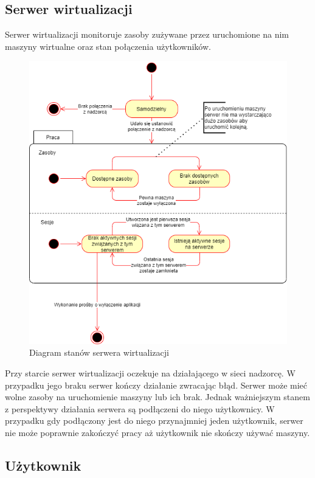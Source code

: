 \documentclass[../opis-rozwiazania.tex]{subfiles}
\begin{document}
\subsection{Serwer wirtualizacji}

Serwer wirtualizacji monitoruje zasoby zużywane przez uruchomione na nim maszyny wirtualne oraz stan połączenia użytkowników.

\begin{figure}[H]
  \centering
  \includegraphics[width=\textwidth]{../diagrams/state_diagrams/virtualisation_server.png}
  \caption{Diagram stanów serwera wirtualizacji}
  \label{state_virtsrv}
\end{figure}

Przy starcie serwer wirtualizacji oczekuje na działającego w sieci nadzorcę.
W przypadku jego braku serwer kończy działanie zwracając błąd.
Serwer może mieć wolne zasoby na uruchomienie maszyny lub ich brak.
Jednak ważniejszym stanem z perspektywy działania serwera są podłączeni do niego użytkownicy.
W przypadku gdy podłączony jest do niego przynajmniej jeden użytkownik, serwer nie może poprawnie zakończyć pracy aż użytkownik nie skończy używać maszyny.

\subsection{Użytkownik}
\end{document}
